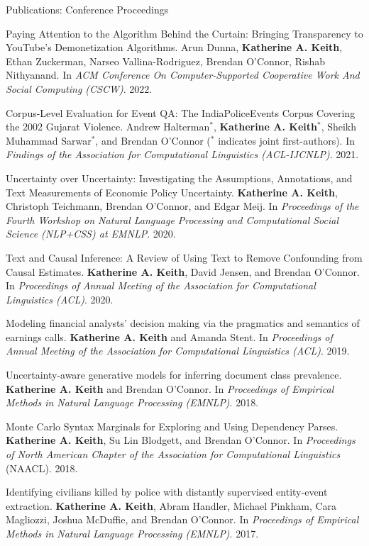 \documentclass{resume} %
\begin{document}
\begin{rSection}{Publications: Conference Proceedings}
\begin{etaremune}

\item Paying Attention to the Algorithm Behind the Curtain: Bringing Transparency to YouTube's Demonetization Algorithms.
    Arun Dunna, \textbf{Katherine A. Keith}, Ethan Zuckerman, Narseo Vallina-Rodriguez, Brendan O'Connor, Rishab Nithyanand. 
    In \emph{ACM Conference On Computer-Supported Cooperative Work And Social Computing (CSCW)}. 2022. 

\item Corpus-Level Evaluation for Event QA: The IndiaPoliceEvents Corpus Covering the 2002 Gujarat Violence. Andrew Halterman$^*$, \textbf{Katherine A. Keith}$^*$, Sheikh Muhammad Sarwar$^*$, and Brendan O'Connor ($^*$ indicates joint first-authors).  In \emph{Findings of the Association for Computational Linguistics (ACL-IJCNLP)}. 2021.

\item Uncertainty over Uncertainty: Investigating the Assumptions, Annotations, and Text Measurements of Economic Policy Uncertainty. \textbf{Katherine A. Keith}, Christoph Teichmann, Brendan O’Connor, and Edgar Meij.  In \emph{Proceedings of the Fourth Workshop on Natural Language Processing and Computational Social Science (NLP+CSS) at EMNLP}. 2020.

\item Text and Causal Inference: A Review of Using Text to Remove Confounding from Causal Estimates. \textbf{Katherine A. Keith}, David Jensen, and Brendan O'Connor. In \emph{Proceedings of Annual Meeting of the Association for Computational Linguistics (ACL)}. 2020.  

\item Modeling financial analysts' decision making via the pragmatics and semantics of earnings calls. 
\textbf{Katherine A. Keith} and Amanda Stent. 
In \emph{Proceedings of Annual Meeting of the Association for Computational Linguistics (ACL)}.  2019. 

\item Uncertainty-aware generative models for inferring document class prevalence.
\textbf{Katherine A. Keith} and Brendan O'Connor. 
In \emph{Proceedings of Empirical Methods in Natural Language Processing (EMNLP)}. 2018. 

\item Monte Carlo Syntax Marginals for Exploring and Using Dependency Parses.
\textbf{Katherine A. Keith}, Su Lin Blodgett, and Brendan O'Connor.
In \emph{Proceedings of North American Chapter of the Association for Computational Linguistics} (NAACL). 2018.

\item Identifying civilians killed by police with distantly supervised entity-event extraction. 
\textbf{Katherine A. Keith}, Abram Handler, Michael Pinkham, Cara Magliozzi, Joshua McDuffie, and Brendan O'Connor. In \emph{Proceedings of Empirical Methods in Natural Language Processing (EMNLP)}. 2017. 

\end{etaremune}
\end{rSection}
\end{document}
